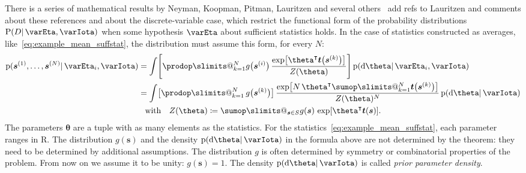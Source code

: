\documentclass[\ifafour a4paper,12pt,\else a5paper,10pt,\fi%
onecolumn,oneside,article,%
british%
]{memoir}
\makeatletter
\theoremstyle{remark}
\theoremstyle{innote}
\def\sum{\DOTSI\sumop\slimits@}
\def\prod{\DOTSI\prodop\slimits@}
\newcommand*{\citep}{\parencites}
\newcommand*{\di}{\mathrm{d}}%
\newcommand*{\RR}{\bm{\mathrm{R}}}
\newcommand*{\defd}{\coloneqq}
\newcommand*{\pf}{\mathrm{p}}%
\newcommand*{\p}{\mathrm{P}}%
\renewcommand*{\|}{\mathpunct{|}}
\newcommand*{\tprod}{\mathop{\textstyle\prod}\nolimits}
\newcommand*{\T}{^\intercal}%
\newcommand*{\puzzle}{\maltese}
\newcommand{\mynote}[1]{ {\color{notecolour}\puzzle\ #1}}
\newcommand*{\yI}{\varIota}
\newcommand*{\ys}{\bm{s}}
\newcommand*{\yt}{\bm{t}}
\newcommand*{\yth}{\bm{\theta}}
\newcommand*{\yso}[1]{\ys^{(#1)}}
\newcommand*{\yH}{\varEta}
\newcommand*{\yD}{D}
\makeatother
\begin{document}
There is a series of mathematical results by Neyman, Koopman, Pitman,
Lauritzen and several others
\citep{neyman1935,koopman1936,pitman1936,darmois1935,lauritzen1982_r1988,kuechleretal1989}[see
also later
analyses:][]{hipp1974,andersen1970,denny1967,fraser1963,barankinetal1963}\mynote{add
  refs to Lauritzen and comments about these references and about the
  discrete-variable case}, which restrict the functional form of the
probability distributions $\p(\yD \| \yH, \yI)$ when some hypothesis $\yH$
about sufficient statistics holds. In the case of statistics constructed as
averages, like~\eqref{eq:example_mean_suffstat}, the distribution must
assume this form, for every $N$:
\begin{multline}
  \label{eq:predictive_KP}
\begin{aligned}
    \pf(\yso{1}, \dotsc, \yso{N} \|\yH_i, \yI )
  &=\int
\Biggl[  \prod_{k=1}^{N}
  g\bigl(\yso{i}\bigr)\,
  \frac{  \exp\bigl[
    \yth\T \yt\bigl( \yso{k} \bigr)
    \bigr] }{Z(\yth)}
  \Biggr]\,
  \pf(\di\yth \| \yH_i, \yI) 
\\
  &=\int
  \bigl[\tprod_{k=1}^{N}g\bigl(\yso{k}\bigr) \bigr]\,
  \frac{  \exp\bigl[
    N \, \yth\T\sum_{k=1}^{N}\yt\bigl( \yso{k} \bigr)
    \bigr]}{Z(\yth)^N}\,
  \pf(\di\yth \| \yI)
\end{aligned}
\\
  \text{with}\quad
  Z(\yth) \defd \sum_{\ys\in S} g(\ys)\, \exp[\yth\T \yt(\ys)].
\end{multline}
The parameters $\yth$ are a tuple with as many elements as the statistics.
For the statistics~\eqref{eq:example_mean_suffstat}, each parameter ranges
in $\RR$. The distribution $g(\ys)$ and the density $\pf(\di\yth \| \yI)$
in the formula above are not determined by the theorem: they need to be
determined by additional assumptions. The distribution $g$ is often
determined by symmetry or combinatorial properties of the problem.
From now on we assume it to be unity: $g(\ys)=1$. The density
$\pf(\di\yth \|\yI)$ is called \emph{prior parameter density}.
\end{document}
